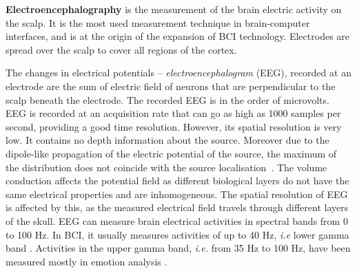 \textbf{Electroencephalography} is the measurement of the brain electric activity on the scalp. 
It is the most used measurement technique in brain-computer interfaces, and is at the origin of the expansion of BCI technology. 
Electrodes are spread over the scalp to cover all regions of the cortex. 


The changes in electrical potentials -- \emph{electroencephalogram} (EEG), recorded at an electrode are the sum of electric field of neurons that are perpendicular to the scalp beneath the electrode. 
The recorded EEG is in the order of microvolts.
EEG is recorded at an acquisition rate that can go as high as 1000 samples per second, providing a good time resolution. However, its spatial resolution is very low. It contains no depth information about the source. 
Moreover due to the dipole-like propagation of the electric potential of the source, the maximum of the distribution does not coincide with the source localisation~\citep{proverbio_electromagnetic_2003}. 
The volume conduction affects the potential field as different biological layers do not have the same electrical properties and are inhomogeneous. 
The spatial resolution of EEG is affected by this, as the measured electrical field travels through different layers of the skull.
EEG can measure brain electrical activities in spectral bands from 0 to 100 Hz. In BCI, it usually measures activities of up to 40 Hz, \textit{i.e} lower gamma band \citep{schalk_brain-computer_2011}. Activities in the upper gamma band, \textit{i.e.} from 35 Hz to 100 Hz, have been measured mostly in emotion analysis \citep{li_emotion_2009, muller_processing_1999}. 

